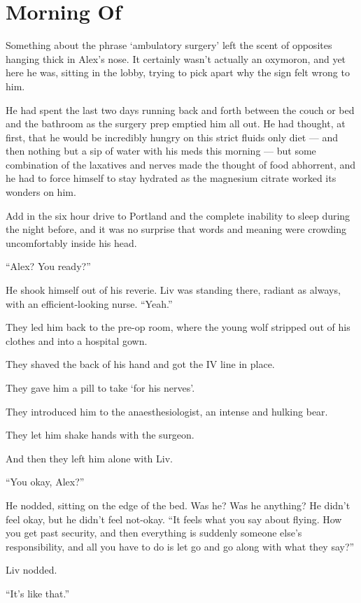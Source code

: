 \chapter{Morning Of}

Something about the phrase `ambulatory surgery' left the scent of opposites hanging thick in Alex's nose. It certainly wasn't actually an oxymoron, and yet here he was, sitting in the lobby, trying to pick apart why the sign felt wrong to him.

He had spent the last two days running back and forth between the couch or bed and the bathroom as the surgery prep emptied him all out. He had thought, at first, that he would be incredibly hungry on this strict fluids only diet --- and then nothing but a sip of water with his meds this morning --- but some combination of the laxatives and nerves made the thought of food abhorrent, and he had to force himself to stay hydrated as the magnesium citrate worked its wonders on him.

Add in the six hour drive to Portland and the complete inability to sleep during the night before, and it was no surprise that words and meaning were crowding uncomfortably inside his head.

``Alex? You ready?''

He shook himself out of his reverie. Liv was standing there, radiant as always, with an efficient-looking nurse. ``Yeah.''

They led him back to the pre-op room, where the young wolf stripped out of his clothes and into a hospital gown.

They shaved the back of his hand and got the IV line in place.

They gave him a pill to take `for his nerves'.

They introduced him to the anaesthesiologist, an intense and hulking bear.

They let him shake hands with the surgeon.

And then they left him alone with Liv.

``You okay, Alex?''

He nodded, sitting on the edge of the bed. Was he? Was he anything? He didn't feel okay, but he didn't feel not-okay. ``It feels what you say about flying. How you get past security, and then everything is suddenly someone else's responsibility, and all you have to do is let go and go along with what they say?''

Liv nodded.

``It's like that.''

